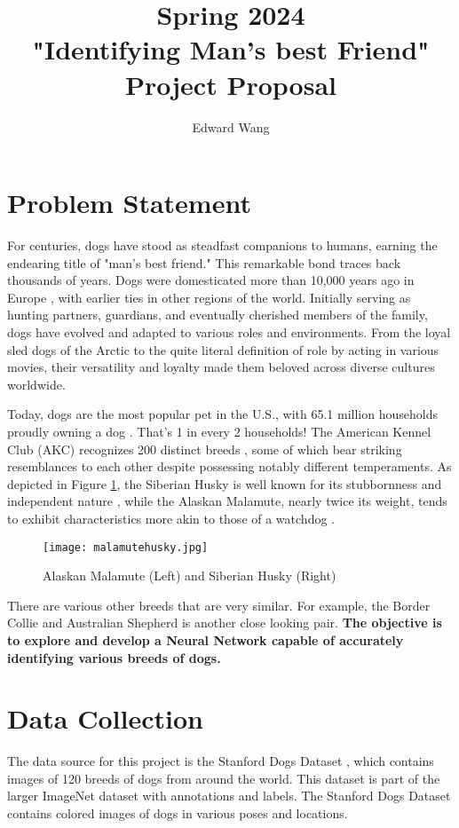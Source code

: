 \documentclass[11pt]{article}
\title{Spring 2024 \\
"Identifying Man's best Friend" \\
Project Proposal}
\author{Edward Wang}
\date{}
\begin{document}
\maketitle
\section{Problem Statement}

For centuries, dogs have stood as steadfast companions to humans, earning the endearing title of "man's best friend." This remarkable bond traces back thousands of years. Dogs were domesticated more than 10,000 years ago in Europe \cite{dog1}, with earlier ties in other regions of the world. Initially serving as hunting partners, guardians, and eventually cherished members of the family, dogs have evolved and adapted to various roles and environments. From the loyal sled dogs of the Arctic to the quite literal definition of role by acting in various movies, their versatility and loyalty made them beloved across diverse cultures worldwide. 

Today, dogs are the most popular pet in the U.S., with 65.1 million households  proudly owning a dog \cite{forbes}. That's 1 in every 2 households! The American Kennel Club (AKC) recognizes 200 distinct breeds \cite{akc}, some of which bear striking resemblances to each other despite possessing notably different temperaments. As depicted in Figure \ref{fig:husky}, the Siberian Husky is well known for its stubbornness and independent nature     \cite{akc_husky}, while the Alaskan Malamute, nearly twice its weight, tends to exhibit characteristics more akin to those of a watchdog \cite{akc_mal}. 

\begin{figure}[h]
\centering
\texttt{[image: malamutehusky.jpg]}
\caption{\label{fig:husky}Alaskan Malamute (Left) and Siberian Husky (Right)}
\end{figure}

There are various other breeds that are very similar. For example, the Border Collie and Australian Shepherd is another close looking pair. \textbf{The objective is to explore and develop a Neural Network capable of accurately identifying various breeds of dogs.}

\section{Data Collection}

The data source for this project is the Stanford Dogs Dataset \cite{data_source}, which contains images of 120 breeds of dogs from around the world. This dataset is part of the larger ImageNet dataset with annotations and labels. The Stanford Dogs Dataset contains colored images of dogs in various poses and locations. 
\end{document}
